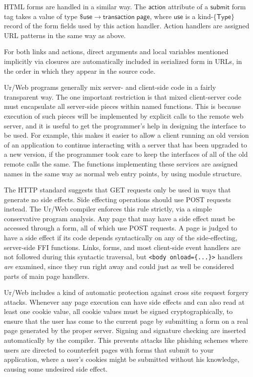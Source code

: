 \documentclass{article}
\newcommand{\mt}[1]{\mathsf{#1}}
\begin{document}
HTML forms are handled in a similar way.  The $\mt{action}$ attribute of a $\mt{submit}$ form tag takes a value of type $\$\mt{use} \to \mt{transaction} \; \mt{page}$, where $\mt{use}$ is a kind-$\{\mt{Type}\}$ record of the form fields used by this action handler.  Action handlers are assigned URL patterns in the same way as above.

For both links and actions, direct arguments and local variables mentioned implicitly via closures are automatically included in serialized form in URLs, in the order in which they appear in the source code.

Ur/Web programs generally mix server- and client-side code in a fairly transparent way.  The one important restriction is that mixed client-server code must encapsulate all server-side pieces within named functions.  This is because execution of such pieces will be implemented by explicit calls to the remote web server, and it is useful to get the programmer's help in designing the interface to be used.  For example, this makes it easier to allow a client running an old version of an application to continue interacting with a server that has been upgraded to a new version, if the programmer took care to keep the interfaces of all of the old remote calls the same.  The functions implementing these services are assigned names in the same way as normal web entry points, by using module structure.

\medskip

The HTTP standard suggests that GET requests only be used in ways that generate no side effects.  Side effecting operations should use POST requests instead.  The Ur/Web compiler enforces this rule strictly, via a simple conservative program analysis.  Any page that may have a side effect must be accessed through a form, all of which use POST requests.  A page is judged to have a side effect if its code depends syntactically on any of the side-effecting, server-side FFI functions.  Links, forms, and most client-side event handlers are not followed during this syntactic traversal, but \texttt{<body onload=\{...\}>} handlers \emph{are} examined, since they run right away and could just as well be considered parts of main page handlers.

Ur/Web includes a kind of automatic protection against cross site request forgery attacks.  Whenever any page execution can have side effects and can also read at least one cookie value, all cookie values must be signed cryptographically, to ensure that the user has come to the current page by submitting a form on a real page generated by the proper server.  Signing and signature checking are inserted automatically by the compiler.  This prevents attacks like phishing schemes where users are directed to counterfeit pages with forms that submit to your application, where a user's cookies might be submitted without his knowledge, causing some undesired side effect.
\end{document}
